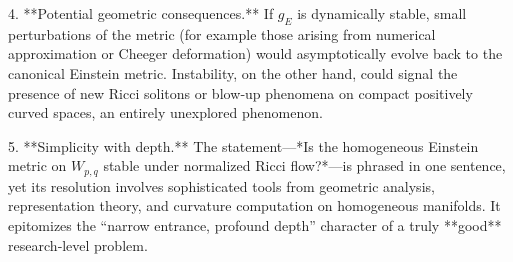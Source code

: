 4. **Potential geometric consequences.**  
   If \(g_E\) is dynamically stable, small perturbations of the metric (for example those arising from numerical approximation or Cheeger deformation) would asymptotically evolve back to the canonical Einstein metric.  
   Instability, on the other hand, could signal the presence of new Ricci solitons or blow‑up phenomena on compact positively curved spaces, an entirely unexplored phenomenon.

5. **Simplicity with depth.**  
   The statement—*Is the homogeneous Einstein metric on \(W_{p,q}\) stable under normalized Ricci flow?*—is phrased in one sentence, yet its resolution involves sophisticated tools from geometric analysis, representation theory, and curvature computation on homogeneous manifolds.  
   It epitomizes the “narrow entrance, profound depth” character of a truly **good** research‑level problem.